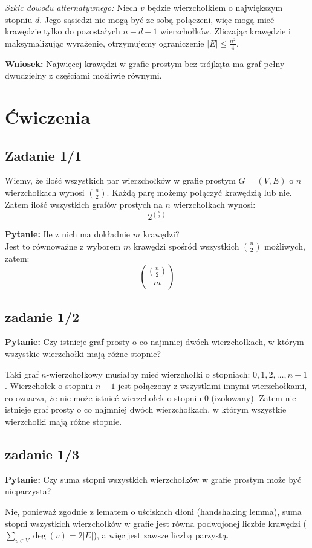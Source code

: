 \documentclass{article}
\begin{document}
\vspace{0.5em}
\textit{Szkic dowodu alternatywnego:} Niech $v$ będzie wierzchołkiem o największym stopniu $d$. Jego sąsiedzi nie mogą być ze sobą połączeni, więc mogą mieć krawędzie tylko do pozostałych $n-d-1$ wierzchołków. Zliczając krawędzie i maksymalizując wyrażenie, otrzymujemy ograniczenie $|E| \leq \frac{n^2}{4}$. 

\textbf{Wniosek:} Najwięcej krawędzi w grafie prostym bez trójkąta ma graf pełny dwudzielny z częściami możliwie równymi.
\newpage
\section*{Ćwiczenia}

\subsection*{Zadanie 1/1}

Wiemy, że ilość wszystkich par wierzchołków w grafie prostym $G = (V, E)$ o $n$ wierzchołkach wynosi $\binom{n}{2}$.
Każdą parę możemy połączyć krawędzią lub nie.
Zatem ilość wszystkich grafów prostych na $n$ wierzchołkach wynosi:
\[
2^{\binom{n}{2}}
\]

\textbf{Pytanie:} Ile z nich ma dokładnie $m$ krawędzi? \\
Jest to równoważne z wyborem $m$ krawędzi spośród wszystkich $\binom{n}{2}$ możliwych, zatem:
\[
\binom{\binom{n}{2}}{m}
\]

\subsection*{zadanie 1/2}
\textbf{Pytanie:} Czy istnieje graf prosty o co najmniej dwóch wierzchołkach, w którym wszystkie wierzchołki mają różne stopnie?

Taki graf $n$-wierzchołkowy musiałby mieć wierzchołki o stopniach: $0, 1, 2, \dots, n-1$.
Wierzchołek o stopniu $n-1$ jest połączony z wszystkimi innymi wierzchołkami, co oznacza, że nie może istnieć wierzchołek o stopniu 0 (izolowany).
Zatem nie istnieje graf prosty o co najmniej dwóch wierzchołkach, w którym wszystkie wierzchołki mają różne stopnie.

\subsection*{zadanie 1/3}
\textbf{Pytanie:} Czy suma stopni wszystkich wierzchołków w grafie prostym może być nieparzysta?

Nie, ponieważ zgodnie z lematem o uściskach dłoni (handshaking lemma), suma stopni wszystkich wierzchołków w grafie jest równa podwojonej liczbie krawędzi ($ \sum_{v \in V} \deg(v) = 2|E| $), a więc jest zawsze liczbą parzystą.
\end{document}
